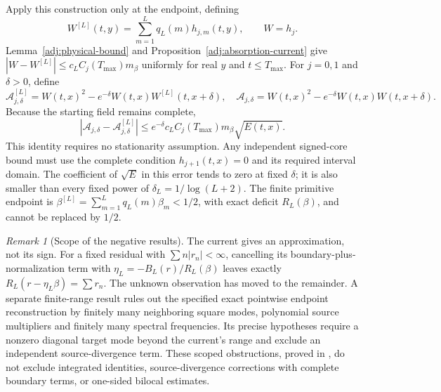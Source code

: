 \documentclass[11pt]{article}
\numberwithin{equation}{section}
\theoremstyle{definition}
\theoremstyle{remark}
\newtheorem{remark}[theorem]{Remark}
\begin{document}
Apply this construction only at the endpoint, defining
\[
 W^{[L]}(t,y)=\sum_{m=1}^Lq_L(m)h_{j,m}(t,y),\qquad W=h_j.
\]
Lemma~\ref{adj:physical-bound} and
Proposition~\ref{adj:absorption-current} give
$|W-W^{[L]}|\le c_LC_j(T_{\max})m_\beta$ uniformly for real $y$
and $t\le T_{\max}$.
For $j=0,1$ and $\delta>0$, define
\[
 \mathcal A^{[L]}_{j,\delta}
 =W(t,x)^2-e^{-\delta}W(t,x)W^{[L]}(t,x+\delta),
 \quad
 \mathcal A_{j,\delta}=W(t,x)^2-e^{-\delta}W(t,x)W(t,x+\delta).
\]
Because the starting field remains complete,
\begin{equation}
 |\mathcal A_{j,\delta}-\mathcal A^{[L]}_{j,\delta}|
 \le e^{-\delta}c_LC_j(T_{\max})m_\beta\sqrt{E(t,x)}.
 \label{adj:factor-preserving-current}
\end{equation}
This identity requires no stationarity assumption.
Any independent signed-core bound must use the complete condition
$h_{j+1}(t,x)=0$ and its required interval domain.
The coefficient of $\sqrt E$ in this error tends to zero at fixed
$\delta$; it is also smaller than every fixed power of
$\delta_L=1/\log(L+2)$.
The finite primitive endpoint is
$\beta^{[L]}=\sum_{m=1}^Lq_L(m)\beta_m<1/2$, with exact deficit
$R_L(\beta)$, and cannot be replaced by $1/2$.

\begin{remark}[Scope of the negative results]
\label{adj:limitations}
The current gives an approximation, not its sign.
For a fixed residual with $\sum n|r_n|<\infty$, cancelling its
boundary-plus-normalization
term with $\eta_L=-B_L(r)/R_L(\beta)$ leaves exactly
$R_L(r-\eta_L\beta)=\sum r_n$.
The unknown observation has moved to the remainder.
A separate finite-range result rules out the specified exact pointwise
endpoint reconstruction by finitely many neighboring square modes,
polynomial source multipliers and finitely many spectral frequencies.
Its precise hypotheses require a nonzero diagonal target mode beyond
the current's range and exclude an independent source-divergence term.
These scoped obstructions, proved in \cite{ThetaAdjoint}, do not exclude
integrated identities, source-divergence corrections with complete
boundary terms, or one-sided bilocal estimates.
\end{remark}
\end{document}
